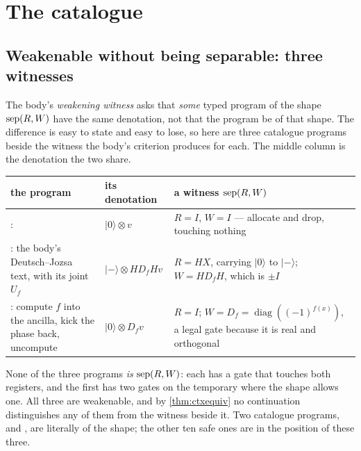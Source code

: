 \documentclass[acmsmall,screen,review,anonymous,nonacm]{acmart}
\begin{document}
\section{The catalogue}\label{app:catalogue}

\subsection{Weakenable without being separable: three witnesses}
\label{app:witness}

The body's \emph{weakening witness} asks that \emph{some} typed program of
the shape $\mathrm{sep}(R,W)$ have the same denotation, not that the program be of
that shape. The
difference is easy to state and easy to lose, so here are three catalogue
programs beside the witness the body's criterion produces for each. The middle
column is the denotation the two share.

\begin{center}
\small
\begin{tabular}{@{}L{.30\linewidth}L{.30\linewidth}L{.30\linewidth}@{}}
\toprule
\textbf{the program} & \textbf{its denotation} & \textbf{a witness $\mathrm{sep}(R,W)$}\\
\midrule
{}: 
  & $|0\rangle \otimes v$
  & $R = I$, $W = I$ --- allocate and drop, touching nothing\\[2pt]
: the body's Deutsch--Jozsa text, with its joint $U_f$
  & $|{-}\rangle \otimes HD_fHv$
  & $R = HX$, carrying $|0\rangle$ to $|{-}\rangle$; $W = HD_fH$, which is
    $\pm I$\\[2pt]
: compute $f$ into the ancilla, kick the phase back,
  uncompute
  & $|0\rangle \otimes D_f v$
  & $R = I$; $W = D_f = \operatorname{diag}((-1)^{f(x)})$, a legal gate
    because it is real and orthogonal\\
\bottomrule
\end{tabular}
\end{center}

None of the three programs \emph{is} $\mathrm{sep}(R,W)$: each has a gate that touches
both registers, and the first has two gates on the temporary where the shape
allows one. All three are weakenable, and by \cref{thm:ctxequiv} no
continuation distinguishes any of them from the witness beside it. Two
catalogue programs,  and , are literally of the
shape; the other ten safe ones are in the position of these three.
\end{document}
